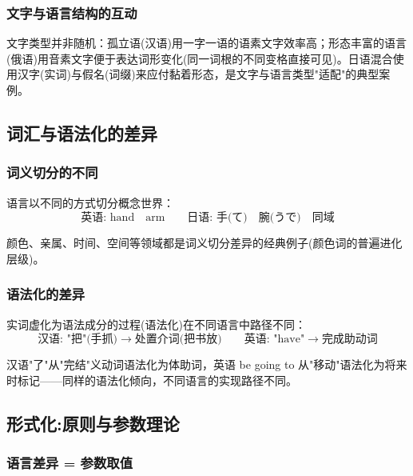 \subsubsection{文字与语言结构的互动}

文字类型并非随机：孤立语(汉语)用一字一语的语素文字效率高；形态丰富的语言(俄语)用音素文字便于表达词形变化(同一词根的不同变格直接可见)。日语混合使用汉字(实词)与假名(词缀)来应付黏着形态，是文字与语言类型"适配"的典型案例。

\subsection{词汇与语法化的差异}

\subsubsection{词义切分的不同}

语言以不同的方式切分概念世界：
\begin{equation}
    \text{英语: } \text{hand} \quad \text{arm} \qquad \text{日语: } \text{手(て)} \quad \text{腕(うで)} \quad \text{同域}
\end{equation}

颜色、亲属、时间、空间等领域都是词义切分差异的经典例子(颜色词的普遍进化层级)。

\subsubsection{语法化的差异}

实词虚化为语法成分的过程(语法化)在不同语言中路径不同：
\begin{equation}
    \text{汉语: } \text{"把"(手抓)} \rightarrow \text{处置介词(把书放)} \qquad \text{英语: } \text{"have"} \rightarrow \text{完成助动词}
\end{equation}

汉语"了"从"完结"义动词语法化为体助词，英语 be going to 从"移动"语法化为将来时标记——同样的语法化倾向，不同语言的实现路径不同。

\subsection{形式化:原则与参数理论}

\subsubsection{语言差异 = 参数取值}

